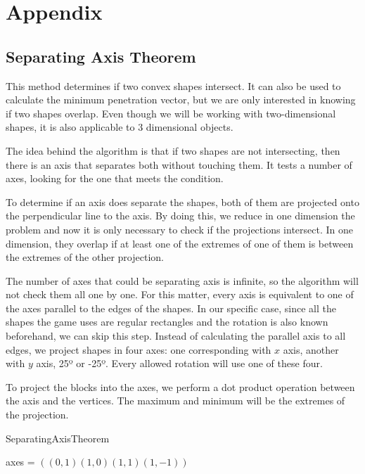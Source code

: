 \chapter{Appendix}\label{ch:appendix}

\section{Separating Axis Theorem}

This method determines if two convex shapes intersect. It can also be used to calculate the minimum penetration vector, but we are only interested in knowing if two shapes overlap. Even though we will be working with two-dimensional shapes, it is also applicable to 3 dimensional objects. \cite{ericson2004real}

The idea behind the algorithm is that if two shapes are not intersecting, then there is an axis that separates both without touching them. It tests a number of axes, looking for the one that meets the condition.

To determine if an axis does separate the shapes, both of them are projected onto the perpendicular line to the axis. By doing this, we reduce in one dimension the problem and now it is only necessary to check if the projections intersect. In one dimension, they overlap if at least one of the extremes of one of them is between the extremes of the other projection.

The number of axes that could be separating axis is infinite, so the algorithm will not check them all one by one. For this matter, every axis is equivalent to one of the axes parallel to the edges of the shapes. In our specific case, since all the shapes the game uses are regular rectangles and the rotation is also known beforehand, we can skip this step. Instead of calculating the parallel axis to all edges, we project shapes in four axes: one corresponding with $x$ axis, another with $y$ axis, 25º or -25º. Every allowed rotation will use one of these four.

To project the blocks into the axes, we perform a dot product operation between the axis and the vertices. The maximum and minimum will be the extremes of the projection. 

\begin{algorithm}[H]
	\caption{SeparatingAxisTheorem}
	\label{a:sat}

		axes = $((0,1)(1,0)(1,1)(1,-1))$\;
	
\end{algorithm}

